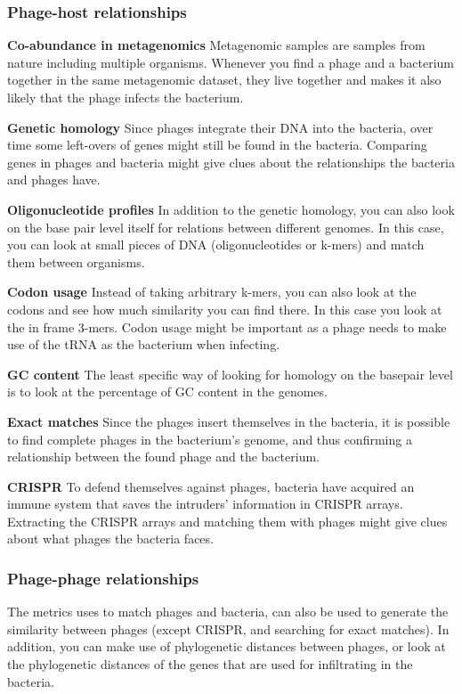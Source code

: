 \documentclass{article}
\begin{document}
\subsubsection{Phage-host relationships}

\textbf{Co-abundance in metagenomics} Metagenomic samples are samples from
nature including multiple organisms. Whenever you find a phage and a
bacterium together in the same metagenomic dataset, they live together and
makes it also likely that the phage infects the bacterium.

\textbf{Genetic homology} Since phages integrate their DNA into the bacteria, 
over time some left-overs of genes might still be found in the bacteria. 
Comparing genes in phages and bacteria might give clues about the relationships
the bacteria and phages have.

\textbf{Oligonucleotide profiles} In addition to the genetic homology, you can 
also look on the base pair level itself for relations between different
genomes. In this case, you can look at small pieces of DNA (oligonucleotides or k-mers) 
and match them between organisms.

\textbf{Codon usage} Instead of taking arbitrary k-mers, you can also look 
at the codons and see how much similarity you can find there. In this case
you look at the in frame 3-mers. Codon usage might be important as a phage
needs to make use of the tRNA as the bacterium when infecting.

\textbf{GC content} The least specific way of looking for homology on the
basepair level is to look at the percentage of GC content in the genomes.

\textbf{Exact matches} Since the phages insert themselves in the bacteria, 
it is possible to find complete phages in the bacterium's genome, and thus
confirming a relationship between the found phage and the bacterium.

\textbf{CRISPR} To defend themselves against phages, bacteria have acquired
an immune system that saves the intruders' information in CRISPR arrays. 
Extracting the CRISPR arrays and matching them with phages might give
clues about what phages the bacteria faces.

\subsubsection{Phage-phage relationships}

The metrics uses to match phages and bacteria, can also be used to 
generate the similarity between phages (except CRISPR, and searching for exact matches). 
In addition, you can make use of phylogenetic distances between phages, or look
at the phylogenetic distances of the genes that are used for infiltrating in 
the bacteria.
\end{document}
